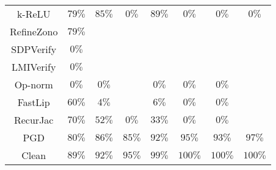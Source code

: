 \begin{table}
{\begin{tabular}{c|c|c|c|c|c|c|c}
       k-ReLU &        $79\%$ &        $85\%$ &         $0\%$ &        $89\%$ &         $0\%$ &         $0\%$ &         $0\%$ \\
   RefineZono &        $79\%$ &               &               &               &               &               &               \\
    SDPVerify &         $0\%$ &               &               &               &               &               &               \\
    LMIVerify &         $0\%$ &               &               &               &               &               &               \\
      Op-norm &         $0\%$ &         $0\%$ &               &         $0\%$ &         $0\%$ &         $0\%$ &               \\
      FastLip &        $60\%$ &         $4\%$ &               &         $6\%$ &         $0\%$ &         $0\%$ &               \\
     RecurJac &        $70\%$ &        $52\%$ &         $0\%$ &        $33\%$ &         $0\%$ &         $0\%$ &               \\
\hline
          PGD &        $80\%$ &        $86\%$ &        $85\%$ &        $92\%$ &        $95\%$ &        $93\%$ &        $97\%$ \\
\hline
        Clean &        $89\%$ &        $92\%$ &        $95\%$ &        $99\%$ &       $100\%$ &       $100\%$ &       $100\%$ \\

    \bottomrule
    \end{tabular}
    }
    \label{table:exp-A-robust-accuracy-mnist-0}
\end{table}
    

